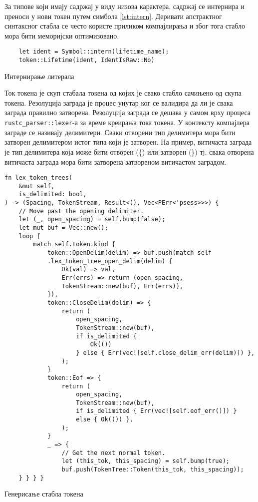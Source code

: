 За типове који имају садржај у виду низова карактера, садржај се интернира и преноси 
у нови токен путем симбола \ref{lst:intern}. Деривати апстрактног синтаксног стабла се често користе приликом компајлирања и због тога 
стабло мора бити меморијски оптимизовано.

\begin{listing}[H]
\begin{verbatim}
    let ident = Symbol::intern(lifetime_name);
    token::Lifetime(ident, IdentIsRaw::No)
\end{verbatim}
\caption{Интернирање литерала}
\label{lst:intern}
\end{listing}

Ток токена је скуп стабала токена од којих је свако стабло сачињено од скупа токена.  
Резолуција заграда је процес унутар ког се валидира да ли је свака заграда правилно затворена.
Резолуција заграда се дешава у самом врху процеса \verb|rustc_parser::lexer|-а 
за време креирања тока токена. У контексту компајлера заграде се називају делимитери. 
Сваки отворени тип делимитера мора бити затворен делимитером истог типа који је затворен.
На пример, витичаста заграда је тип делимитера која може бити отворен (\{) или затворен (\}) тј.
свака отворена витичаста заграда мора бити затворена затвореном витичастом заградом.

\begin{listing}[H]
\begin{verbatim}
fn lex_token_trees(
    &mut self,
    is_delimited: bool,
) -> (Spacing, TokenStream, Result<(), Vec<PErr<'psess>>>) {
    // Move past the opening delimiter.
    let (_, open_spacing) = self.bump(false);
    let mut buf = Vec::new();
    loop {
        match self.token.kind {
            token::OpenDelim(delim) => buf.push(match self
            .lex_token_tree_open_delim(delim) {
                Ok(val) => val,
                Err(errs) => return (open_spacing, 
                TokenStream::new(buf), Err(errs)),
            }),
            token::CloseDelim(delim) => {
                return (
                    open_spacing,
                    TokenStream::new(buf),
                    if is_delimited { 
                        Ok(()) 
                    } else { Err(vec![self.close_delim_err(delim)]) },
                );
            }
            token::Eof => {
                return (
                    open_spacing,
                    TokenStream::new(buf),
                    if is_delimited { Err(vec![self.eof_err()]) } 
                    else { Ok(()) },
                );
            }
            _ => {
                // Get the next normal token.
                let (this_tok, this_spacing) = self.bump(true);
                buf.push(TokenTree::Token(this_tok, this_spacing));
    } } } }
\end{verbatim}
\caption{Генерисање стабла токена}
\end{listing}


